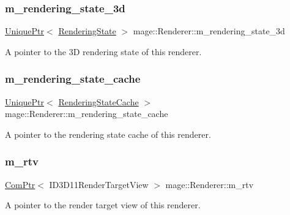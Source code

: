 \subsubsection{\texorpdfstring{m\+\_\+rendering\+\_\+state\+\_\+3d}{m\_rendering\_state\_3d}}
{\footnotesize\ttfamily \hyperlink{namespacemage_a3316d7143a973e37adf1110f2e80ca31}{Unique\+Ptr}$<$ \hyperlink{structmage_1_1_rendering_state}{Rendering\+State} $>$ mage\+::\+Renderer\+::m\+\_\+rendering\+\_\+state\+\_\+3d\hspace{0.3cm}{\ttfamily [private]}}

A pointer to the 3D rendering state of this renderer. \hypertarget{classmage_1_1_renderer_a3d9f823ecef314a974c4cdb3a71a1853}{}\label{classmage_1_1_renderer_a3d9f823ecef314a974c4cdb3a71a1853} 
\subsubsection{\texorpdfstring{m\+\_\+rendering\+\_\+state\+\_\+cache}{m\_rendering\_state\_cache}}
{\footnotesize\ttfamily \hyperlink{namespacemage_a3316d7143a973e37adf1110f2e80ca31}{Unique\+Ptr}$<$ \hyperlink{structmage_1_1_rendering_state_cache}{Rendering\+State\+Cache} $>$ mage\+::\+Renderer\+::m\+\_\+rendering\+\_\+state\+\_\+cache\hspace{0.3cm}{\ttfamily [private]}}

A pointer to the rendering state cache of this renderer. \hypertarget{classmage_1_1_renderer_a86ed436120830cef3e0173f85550aa50}{}\label{classmage_1_1_renderer_a86ed436120830cef3e0173f85550aa50} 
\subsubsection{\texorpdfstring{m\+\_\+rtv}{m\_rtv}}
{\footnotesize\ttfamily \hyperlink{namespacemage_ae74f374780900893caa5555d1031fd79}{Com\+Ptr}$<$ I\+D3\+D11\+Render\+Target\+View $>$ mage\+::\+Renderer\+::m\+\_\+rtv\hspace{0.3cm}{\ttfamily [private]}}

A pointer to the render target view of this renderer. \hypertarget{classmage_1_1_renderer_a5419a7a11e8f0f69e92dd6a5cb9bd217}{}\label{classmage_1_1_renderer_a5419a7a11e8f0f69e92dd6a5cb9bd217} 
